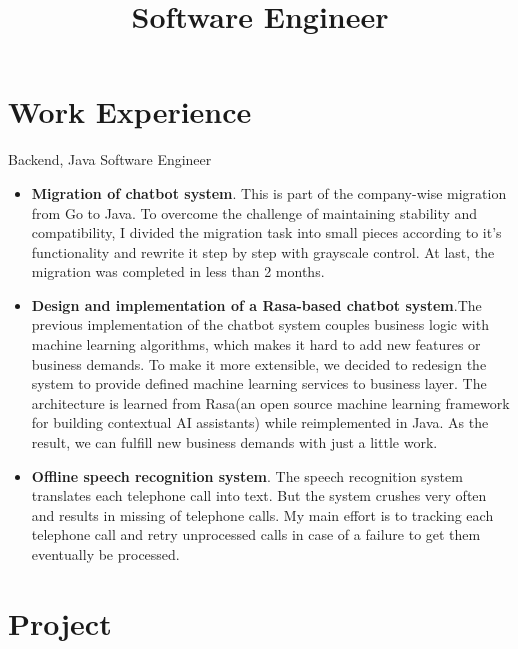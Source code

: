 \documentclass[11pt,a4paper]{moderncv}
\title{Software Engineer}
\begin{document}
\maketitle


\section{Work Experience}
{Backend, Java}
{Software Engineer}{}{
\begin{itemize}
	\item \textbf{Migration of chatbot system}. This is part of the company-wise migration from Go to Java. To overcome the challenge of maintaining stability and compatibility, I divided the migration task into small pieces according to it’s functionality and rewrite it step by step with grayscale control. At last, the migration was completed in less than 2 months.
	\item \textbf{Design and implementation of a Rasa-based chatbot system}.The previous implementation of the chatbot system couples business logic with machine learning algorithms, which makes it hard to add new features or business demands. To make it more extensible, we decided to redesign the system to provide defined machine learning services to business layer. The architecture is learned from Rasa(an open source machine learning framework for building contextual AI assistants) while reimplemented in Java. As the result, we can fulfill new business demands with just a little work.
	\item \textbf{Offline speech recognition system}. The speech recognition system translates each telephone call into text. But the system crushes very often and results in missing of telephone calls. My main effort is to tracking each telephone call and retry unprocessed calls in case of a failure to get them eventually be processed.
\end{itemize}
}

\section{Project}
\end{document}
